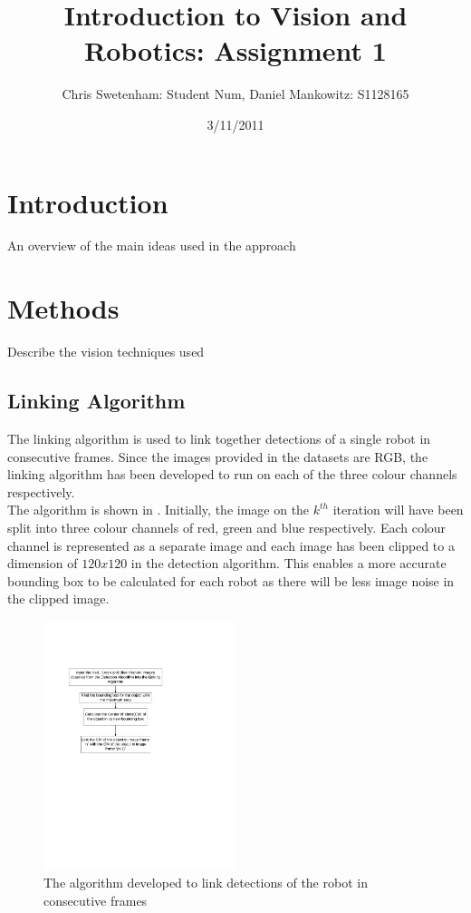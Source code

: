 \documentclass{article}
\title{Introduction to Vision and Robotics: Assignment 1}
\author{Chris Swetenham: Student Num, Daniel Mankowitz: S1128165}
\date{3/11/2011}
\begin{document}
\maketitle

\section{Introduction}
\label{sec:introduction}
An overview of the main ideas used in the approach


\section{Methods}
\label{sec:methods}
Describe the vision techniques used







\subsection{Linking Algorithm}
\label{sec:linking}
The linking algorithm is used to link together detections of a single robot in consecutive frames. Since the images provided in the datasets are RGB, the linking algorithm has been developed to run on each of the three colour channels respectively.\\ 

The algorithm is shown in . Initially, the image on the $k^{th}$ iteration will have been split into three colour channels of red, green and blue respectively. Each colour channel is represented as a separate image and each image has been clipped to a dimension of $120x120$ in the detection algorithm. This enables a more accurate bounding box to be calculated for each robot as there will be less image noise in the clipped image.  \\


\begin{figure}[h!] 
  \centering
    \includegraphics[width=0.5\textwidth]{../Drawings/linkingAlgorithm.pdf}
    \caption{The algorithm developed to link detections of the robot in consecutive frames}
    \label{fig:link}
\end{figure}
\end{document}
